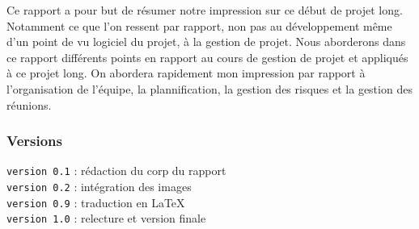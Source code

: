 Ce rapport a pour but de résumer notre impression sur ce début de projet long. Notamment ce que l'on ressent par rapport, non pas au développement même d'un point de vu logiciel du projet, à la gestion de projet. Nous aborderons dans ce rapport différents points en rapport au cours de gestion de projet et appliqués à ce projet long. On abordera rapidement mon impression par rapport à l'organisation de l'équipe, la plannification, la gestion des risques et la gestion des réunions.\vspace{3cm}
\subsubsection*{Versions}
\noindent
\texttt{version 0.1} : rédaction du corp du rapport \\
\texttt{version 0.2} : intégration des images \\
\texttt{version 0.9} : traduction en \LaTeX \\
\texttt{version 1.0} : relecture et version finale